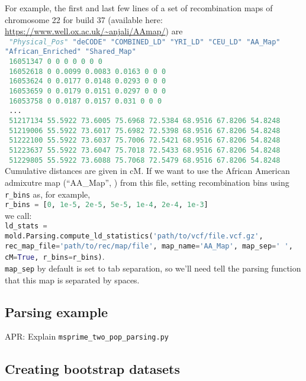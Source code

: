 \documentclass[10pt]{article}
\makeatletter
\renewcommand{\cite}{\citep}
\newcommand{\comment}[1]{{\color{blue}APR: #1}}
\newcommand{\py}[1]{\lstinline[breaklines=true,language=Python, showstringspaces=False]@#1@}
\makeatother
\begin{document}
For example, the first and last few lines of a set of recombination maps of chromosome 22 for build 37 (available here: \url{https://www.well.ox.ac.uk/~anjali/AAmap/}) are\\\small
\py{
"Physical_Pos" "deCODE" "COMBINED_LD" "YRI_LD" "CEU_LD" "AA_Map" "African_Enriched" "Shared_Map"}\\\py{
16051347 0 0 0 0 0 0 0}\\\py{
16052618 0 0.0099 0.0083 0.0163 0 0 0}\\\py{
16053624 0 0.0177 0.0148 0.0293 0 0 0}\\\py{
16053659 0 0.0179 0.0151 0.0297 0 0 0}\\\py{
16053758 0 0.0187 0.0157 0.031 0 0 0}\\\py{
...}\\\py{
51217134 55.5922 73.6005 75.6968 72.5384 68.9516 67.8206 54.8248}\\\py{
51219006 55.5922 73.6017 75.6982 72.5398 68.9516 67.8206 54.8248}\\\py{
51222100 55.5922 73.6037 75.7006 72.5421 68.9516 67.8206 54.8248}\\\py{
51223637 55.5922 73.6047 75.7018 72.5433 68.9516 67.8206 54.8248}\\\py{
51229805 55.5922 73.6088 75.7068 72.5479 68.9516 67.8206 54.8248}\\
\normalsize
Cumulative distances are given in cM.
If we want to use the African American admixutre map (``AA\_Map'', \cite{Hinch2011}) from this file, 
setting recombination bins using \py{r_bins} as, for example,\\
\py{r_bins = [0, 1e-5, 2e-5, 5e-5, 1e-4, 2e-4, 1e-3]}\\
we call:\\
\py{ld_stats = mold.Parsing.compute_ld_statistics('path/to/vcf/file.vcf.gz', rec_map_file='path/to/rec/map/file', map_name='AA_Map', map_sep=' ', cM=True, r_bins=r_bins)}.\\
\py{map_sep} by default is set to tab separation, so we'll need tell the parsing function that this map is separated by spaces.

\subsection{Parsing example}

\comment{Explain \py{msprime_two_pop_parsing.py}}

\subsection{Creating bootstrap datasets}\label{section:bootstrap}
\end{document}
